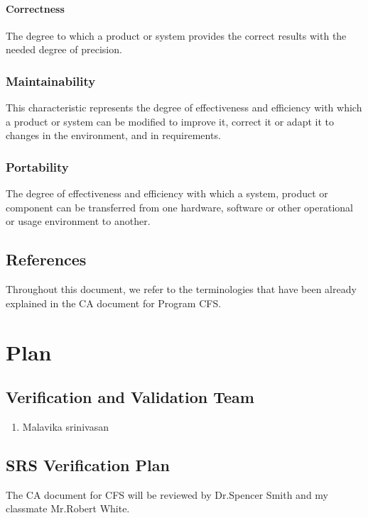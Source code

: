 \documentclass[12pt, titlepage]{article}
\newcommand{\famname}{CFS} %
\begin{document}
\paragraph{Correctness }
The degree to which a product or system provides the correct results with the
needed degree of precision.

\subsubsection{Maintainability}
This characteristic represents the degree of effectiveness and efficiency with
which a product or system can be modified to improve it, correct it or adapt it
to changes in the environment, and in requirements. 

\subsubsection{Portability}
The degree of effectiveness and efficiency with which a system, product or
component can be transferred from one hardware, software or other operational
or usage environment to another. 


\subsection{References}

Throughout this document, we refer to the terminologies that have been already explained in the CA document for Program \famname{}.

\section{Plan}
	
\subsection{Verification and Validation Team}

\begin{enumerate}
	\item Malavika srinivasan
\end{enumerate}


\subsection{SRS Verification Plan}

The CA document for \famname{} will be reviewed by Dr.Spencer Smith and my classmate Mr.Robert White.
\end{document}
